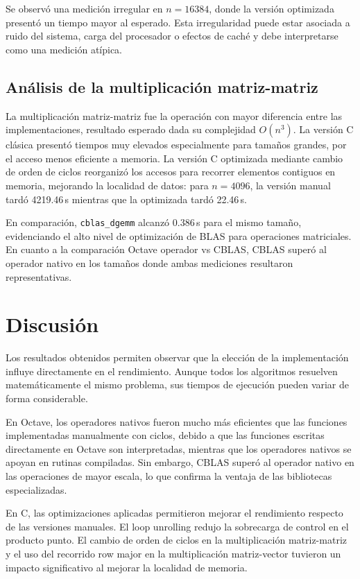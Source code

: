 \documentclass[12pt,letterpaper]{article}
\begin{document}
Se observó una medición irregular en $n = 16384$, donde la versión optimizada presentó un tiempo mayor al esperado. Esta irregularidad puede estar asociada a ruido del sistema, carga del procesador o efectos de caché y debe interpretarse como una medición atípica.

\subsection{Análisis de la multiplicación matriz-matriz}

La multiplicación matriz-matriz fue la operación con mayor diferencia entre las implementaciones, resultado esperado dada su complejidad $O(n^3)$. La versión C clásica presentó tiempos muy elevados especialmente para tamaños grandes, por el acceso menos eficiente a memoria. La versión C optimizada mediante cambio de orden de ciclos reorganizó los accesos para recorrer elementos contiguos en memoria, mejorando la localidad de datos: para $n = 4096$, la versión manual tardó 4219.46\,s mientras que la optimizada tardó 22.46\,s.

En comparación, \texttt{cblas\_dgemm} alcanzó 0.386\,s para el mismo tamaño, evidenciando el alto nivel de optimización de BLAS para operaciones matriciales. En cuanto a la comparación Octave operador vs CBLAS, CBLAS superó al operador nativo en los tamaños donde ambas mediciones resultaron representativas.

\section{Discusión}

Los resultados obtenidos permiten observar que la elección de la implementación influye directamente en el rendimiento. Aunque todos los algoritmos resuelven matemáticamente el mismo problema, sus tiempos de ejecución pueden variar de forma considerable.

En Octave, los operadores nativos fueron mucho más eficientes que las funciones implementadas manualmente con ciclos, debido a que las funciones escritas directamente en Octave son interpretadas, mientras que los operadores nativos se apoyan en rutinas compiladas. Sin embargo, CBLAS superó al operador nativo en las operaciones de mayor escala, lo que confirma la ventaja de las bibliotecas especializadas.

En C, las optimizaciones aplicadas permitieron mejorar el rendimiento respecto de las versiones manuales. El loop unrolling redujo la sobrecarga de control en el producto punto. El cambio de orden de ciclos en la multiplicación matriz-matriz y el uso del recorrido row major en la multiplicación matriz-vector tuvieron un impacto significativo al mejorar la localidad de memoria.
\end{document}
